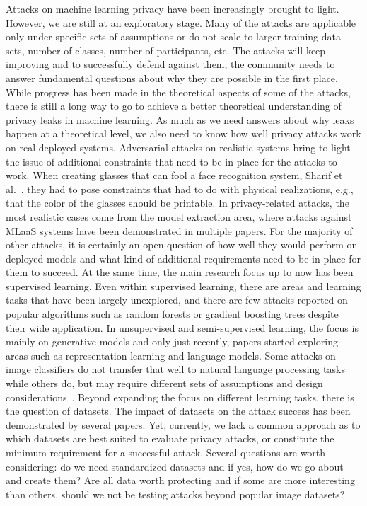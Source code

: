 \label{sec:discussion}
Attacks on machine learning privacy have been increasingly brought to light. However, we are still at an exploratory stage. Many of the attacks are applicable only under specific sets of assumptions or do not scale to larger training data sets, number of classes,  number of participants, etc. The attacks will keep improving and to successfully defend against them, the community needs to answer fundamental questions about why they are possible in the first place. While progress has been made in the theoretical aspects of some of the attacks, there is still a long way to go to achieve a better theoretical understanding of privacy leaks in machine learning.
As much as we need answers about why leaks happen at a theoretical level, we also need to know how well privacy attacks work on real deployed systems. Adversarial attacks on realistic systems bring to light the issue of additional constraints that need to be in place for the attacks to work. When creating glasses that can fool a face recognition system, Sharif et al.~, they had to pose constraints that had to do with physical realizations, e.g., that the color of the glasses should be printable. In privacy-related attacks, the most realistic cases come from the model extraction area, where attacks against MLaaS systems have been demonstrated in multiple papers. For the majority of other attacks, it is certainly an open question of how well they would perform on deployed models and what kind of additional requirements need to be in place for them to succeed.
At the same time, the main research focus up to now has been supervised learning. Even within supervised learning, there are areas and learning tasks that have been largely unexplored, and there are few attacks reported on popular algorithms such as random forests or gradient boosting trees despite their wide application. In unsupervised and semi-supervised learning, the focus is mainly on generative models and only just recently, papers started exploring areas such as representation learning and language models. Some attacks on image classifiers do not transfer that well to natural language processing tasks~ while others do, but may require different sets of assumptions and design considerations~.     
Beyond expanding the focus on different learning tasks, there is the question of datasets. The impact of datasets on the attack success has been demonstrated by several papers. Yet, currently, we lack a common approach as to which datasets are best suited to evaluate privacy attacks, or constitute the minimum requirement for a successful attack. Several questions are worth considering: do we need standardized datasets and if yes, how do we go about and create them? Are all data worth protecting and if some are more interesting than others, should we not be testing attacks beyond popular image datasets?

